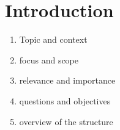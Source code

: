 
\chapter{Introduction}

\begin{enumerate}
    \item
    Topic and context\\
    
    
    \item
    focus and scope
    
    \item
    relevance and importance
    
    \item
    questions and objectives
    
    \item
    overview of the structure
\end{enumerate}


